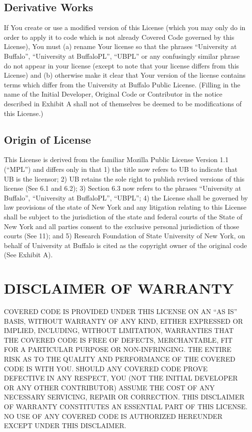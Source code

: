 \documentclass{book}
\begin{document}
\subsection{Derivative Works}
If You create or use a modified version of this License (which you may only do in order to apply it to code which is not already Covered Code governed by this License), You must (a) rename Your license so that the phrases ``University at Buffalo'', ``University at BuffaloPL'', ``UBPL'' or any confusingly similar phrase do not appear in your license (except to note that your license differs from this License) and (b) otherwise make it clear that Your version of the license contains terms which differ from the University at Buffalo Public License. (Filling in the name of the Initial Developer, Original Code or Contributor in the notice described in Exhibit A shall not of themselves be deemed to be modifications of this License.) 

\subsection{Origin of License}
This License is derived from the familiar Mozilla Public License Version 1.1 (``MPL'') and differs only in that 1) the title now refers to UB to indicate that UB is the licensor; 2) UB retains the sole right to publish revised versions of this license (See 6.1 and 6.2); 3) Section 6.3 now refers to the phrases ``University at Buffalo'', ``University at BuffaloPL'', ``UBPL'';  4) the License shall be governed by law provisions of the state of New York and any litigation relating to this License shall be subject to the jurisdiction of the state and federal courts of the State of New York and all parties consent to the exclusive personal jurisdiction of those courts (See 11); and 5) Research Foundation of State University of New York, on behalf of University at Buffalo is cited as the copyright owner of the original code (See Exhibit A).

\section{DISCLAIMER OF WARRANTY}
COVERED CODE IS PROVIDED UNDER THIS LICENSE ON AN ``AS IS'' BASIS, WITHOUT WARRANTY OF ANY KIND, EITHER EXPRESSED OR IMPLIED, INCLUDING, WITHOUT LIMITATION, WARRANTIES THAT THE COVERED CODE IS FREE OF DEFECTS, MERCHANTABLE, FIT FOR A PARTICULAR PURPOSE OR NON-INFRINGING. THE ENTIRE RISK AS TO THE QUALITY AND PERFORMANCE OF THE COVERED CODE IS WITH YOU. SHOULD ANY COVERED CODE PROVE DEFECTIVE IN ANY RESPECT, YOU (NOT THE INITIAL DEVELOPER OR ANY OTHER CONTRIBUTOR) ASSUME THE COST OF ANY NECESSARY SERVICING, REPAIR OR CORRECTION. THIS DISCLAIMER OF WARRANTY CONSTITUTES AN ESSENTIAL PART OF THIS LICENSE. NO USE OF ANY COVERED CODE IS AUTHORIZED HEREUNDER EXCEPT UNDER THIS DISCLAIMER. 
\end{document}
